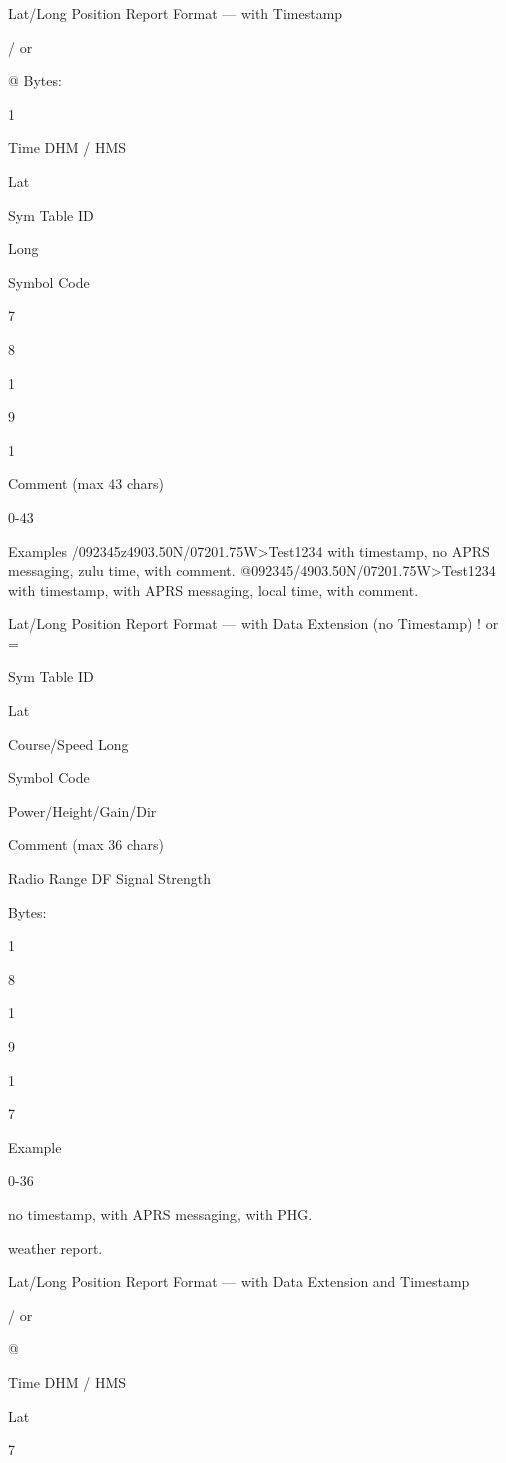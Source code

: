 Lat/Long Position Report Format — with Timestamp

/ or

@
Bytes:

1

Time
DHM /
HMS

Lat

Sym
Table
ID

Long

Symbol
Code

7

8

1

9

1

Comment
(max 43 chars)

0-43

Examples
/092345z4903.50N/07201.75W>Test1234 with timestamp, no APRS messaging, zulu time, with
comment.
@092345/4903.50N/07201.75W>Test1234 with timestamp, with APRS messaging, local time,
with comment.



Lat/Long Position Report Format — with Data Extension (no Timestamp)
! or
=

Sym
Table
ID

Lat

Course/Speed
Long

Symbol
Code

Power/Height/Gain/Dir

Comment
(max 36 chars)

Radio Range
DF Signal Strength

Bytes:

1

8

1

9

1

7

Example

0-36

no timestamp, with APRS messaging, with PHG.


weather report.

Lat/Long Position Report Format — with Data Extension and Timestamp

/ or

@

Time
DHM /
HMS

Lat

7

